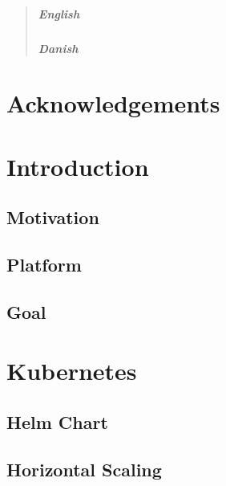 \begin{abstract}
\paragraph{English}

\paragraph{Danish}
\end{abstract}

\chapter*{Acknowledgements}
\thispagestyle{empty}
\clearpage


{ \hypersetup{hidelinks} \tableofcontents {}}

\newpage
{}
\setcounter{page}{1}

\chapter{Introduction}

\section{Motivation}

\section{Platform}

\section{Goal}

\chapter{Kubernetes}

\section{Helm Chart}

\section{Horizontal Scaling}


